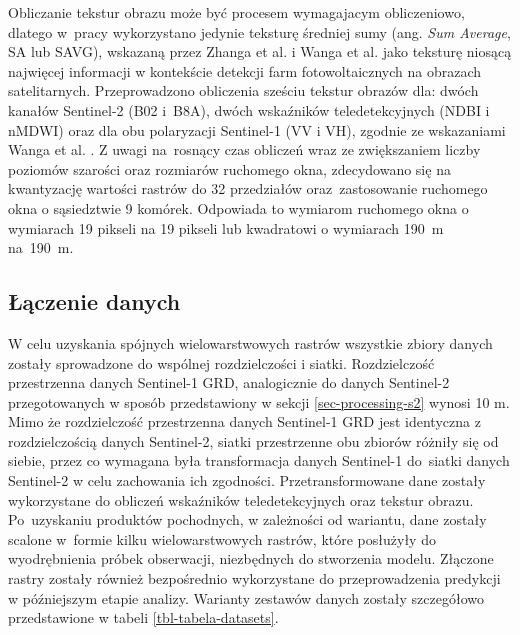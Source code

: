 \documentclass{amuthesis}
\begin{document}
Obliczanie tekstur obrazu może być procesem wymagajacym obliczeniowo,
dlatego w~pracy wykorzystano jedynie teksturę średniej sumy (ang.
\emph{Sum Average}, SA lub SAVG), wskazaną przez Zhanga et al.
\autocite*{zhang_2021_texture} i Wanga et al. \autocite*{wang_2022_pv}
jako teksturę niosącą najwięcej informacji w kontekście detekcji farm
fotowoltaicznych na obrazach satelitarnych. Przeprowadzono obliczenia
sześciu tekstur obrazów dla: dwóch kanałów Sentinel-2 (B02 i~B8A), dwóch
wskaźników teledetekcyjnych (NDBI i nMDWI) oraz dla obu polaryzacji
Sentinel-1 (VV i VH), zgodnie ze wskazaniami Wanga et al.
\autocite*{wang_2022_pv}. Z uwagi na~rosnący czas obliczeń wraz ze
zwiększaniem liczby poziomów szarości oraz rozmiarów ruchomego okna,
zdecydowano się na kwantyzację wartości rastrów do 32 przedziałów
oraz~zastosowanie ruchomego okna o sąsiedztwie 9 komórek. Odpowiada to
wymiarom ruchomego okna o wymiarach 19 pikseli na 19 pikseli lub
kwadratowi o wymiarach 190~m na~190~m.

\hypertarget{sec-processing-data-merging}{%
\subsection{Łączenie danych}\label{sec-processing-data-merging}}

W celu uzyskania spójnych wielowarstwowych rastrów wszystkie zbiory
danych zostały sprowadzone do wspólnej rozdzielczości i siatki.
Rozdzielczość przestrzenna danych Sentinel-1 GRD, analogicznie do danych
Sentinel-2 przegotowanych w sposób przedstawiony w sekcji
\ref{sec-processing-s2} wynosi 10 m. Mimo że rozdzielczość przestrzenna
danych Sentinel-1 GRD jest identyczna z rozdzielczością danych
Sentinel-2, siatki przestrzenne obu zbiorów różniły się od siebie, przez
co wymagana była transformacja danych Sentinel-1 do~siatki danych
Sentinel-2 w celu zachowania ich zgodności. Przetransformowane dane
zostały wykorzystane do obliczeń wskaźników teledetekcyjnych oraz
tekstur obrazu. Po~uzyskaniu produktów pochodnych, w zależności od
wariantu, dane zostały scalone w~formie kilku wielowarstwowych rastrów,
które posłużyły do wyodrębnienia próbek obserwacji, niezbędnych do
stworzenia modelu. Złączone rastry zostały również bezpośrednio
wykorzystane do przeprowadzenia predykcji w późniejszym etapie analizy.
Warianty zestawów danych zostały szczegółowo przedstawione w tabeli
\ref{tbl-tabela-datasets}.
\end{document}
